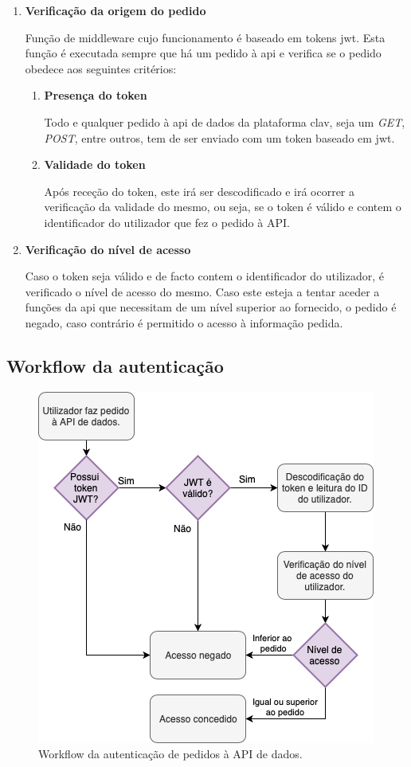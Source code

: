 \begin{enumerate}
    \item \textbf{Verificação da origem do pedido}
    
    Função de middleware cujo funcionamento é baseado em tokens \gls{jwt}. Esta função é executada sempre que há um pedido à \gls{api} e verifica se o pedido obedece aos seguintes critérios:

    \begin{enumerate}
        \item \textbf{Presença do token}
        
        Todo e qualquer pedido à \gls{api} de dados da plataforma \gls{clav}, seja um \emph{GET}, \emph{POST}, entre outros, tem de ser enviado com um token baseado em \gls{jwt}.
        
        \item \textbf{Validade do token}
        
        Após receção do token, este irá ser descodificado e irá ocorrer a verificação da validade do mesmo, ou seja, se o token é válido e contem o identificador do utilizador que fez o pedido à API.
    \end{enumerate}
    
    \item \textbf{Verificação do nível de acesso}
    
    Caso o token seja válido e de facto contem o identificador do utilizador, é verificado o nível de acesso do mesmo. Caso este esteja a tentar aceder a funções da \gls{api} que necessitam de um nível superior ao fornecido, o pedido é negado, caso contrário é permitido o acesso à informação pedida. 
\end{enumerate}

\cleardoublepage
\subsection{Workflow da autenticação}

\begin{figure}[h!]
    \centering
    \includegraphics[width=\textwidth]{img/diagramas/authAPI/AuthAPI.png}
    \caption{Workflow da autenticação de pedidos à API de dados.}
    \label{fig:flow_authCC}
\end{figure}